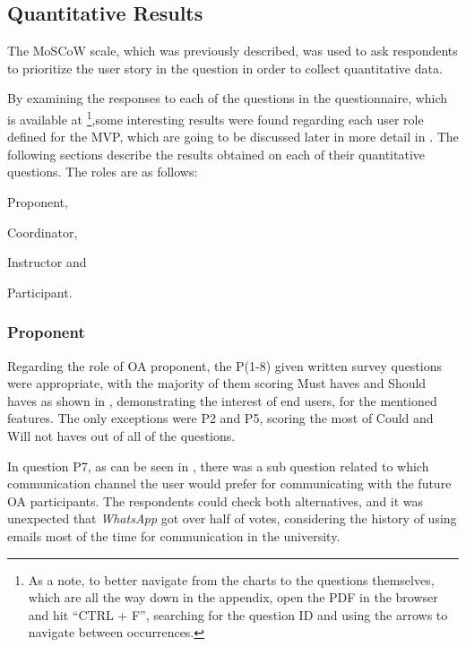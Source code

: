\subsection{Quantitative Results}\label{sec:quantitative-results} %

The MoSCoW scale, which was previously described, was used to ask respondents to prioritize the user story in the question in order to collect quantitative data.

By examining the responses to each of the questions in the questionnaire, which is available at \footnote{As a note, to better navigate from the charts to the questions themselves, which are all the way down in the appendix, open the PDF in the browser and hit ``CTRL + F'', searching for the question \ac{ID} and using the arrows to navigate between occurrences.},some interesting results were found regarding each user role defined for the \ac{MVP}, which are going to be discussed later in more detail in . The following sections describe the results obtained on each of their quantitative questions. The roles are as follows:
\begin{inparaenum}[(a)]
  \item Proponent,
  \item Coordinator,
  \item Instructor and
  \item Participant.
\end{inparaenum}

\subsubsection{Proponent} \label{sec:survey-quant-proponent}

Regarding the role of \ac{OA} proponent, the P(1-8) given written survey questions were appropriate, with the majority of them scoring Must haves and Should haves as shown in , demonstrating the interest of end users, for the mentioned features. The only exceptions were P2 and P5, scoring the most of Could and Will not haves out of all of the questions.

In question P7, as can be seen in , there was a sub question related to which communication channel the user would prefer for communicating with the future \ac{OA} participants. The respondents could check both alternatives, and it was unexpected that \textit{WhatsApp} got over half of votes, considering the history of using emails most of the time for communication in the university.


